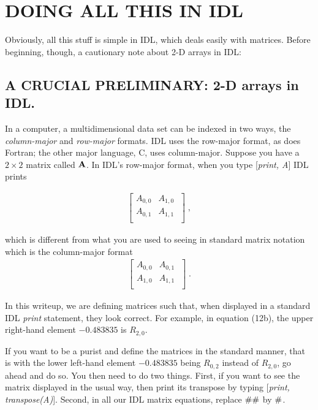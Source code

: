 \documentclass[11pt,preprint]{aastex}
\begin{document}
\section {DOING ALL THIS IN IDL}

	Obviously, all this stuff is simple in IDL, which deals easily with
matrices. Before beginning, though, a cautionary note about 2-D arrays
in IDL:

\subsection {A CRUCIAL PRELIMINARY: 2-D arrays in IDL.}

	In a computer, a multidimensional data set can be indexed in two
ways, the {\it column-major} and {\it row-major} formats.  IDL uses the
row-major format, as does Fortran; the other major language, C, uses
column-major.  Suppose you have a $2 \times 2$ matrix called ${\bf A}$. 
In IDL's row-major format, when you type [{\it print, A}] IDL prints

\begin{mathletters} 
\begin{eqnarray} 
\left[ 
\begin{array}{rrr}
A_{0,0} & A_{1,0} \\
A_{0,1} & A_{1,1} \\
\end{array} 
\; \right] \; ,
\end{eqnarray} 

\noindent which is different from what you are used to seeing in
standard matrix notation which is the column-major format
\begin{eqnarray} 
\left[ 
\begin{array}{rrr}
A_{0,0} & A_{0,1} \\
A_{1,0} & A_{1,1} \\
\end{array} 
\; \right] \; .
\end{eqnarray} 
\end{mathletters} 
	In this writeup, we are defining matrices such that, when
displayed in a standard IDL {\it print} statement, they look correct.
For example, in equation (12b), the upper right-hand element $-0.483835$
is $R_{2,0}$. 

	If you want to be a purist and define the matrices in the
standard manner, that is with the lower left-hand element $-0.483835$
being $R_{0,2}$ instead of $R_{2,0}$, go ahead and do so.  You then need
to do two things.  First, if you want to see the matrix displayed in the
usual way, then print its transpose by typing [{\it print,
transpose(A)}].  Second, in all our IDL matrix equations, replace ${\bf
\# \#}$ by ${\bf \#}$. 
\end{document}
